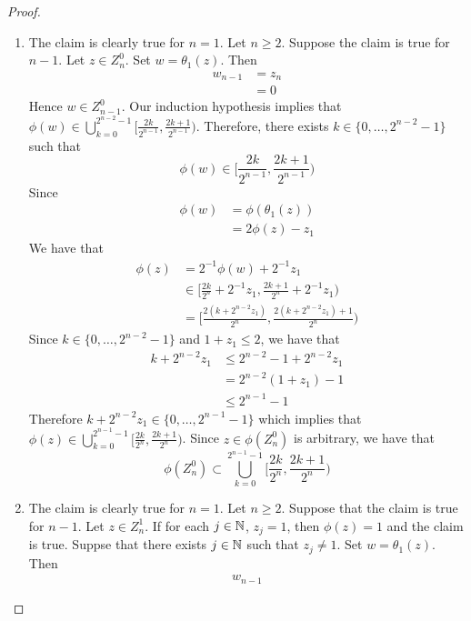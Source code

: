 \documentclass{book}
\begin{document}
	\begin{proof}\
		\begin{enumerate}
			\item The claim is clearly true for $n = 1$. Let $n \geq 2$. Suppose the claim is true for $n-1$. Let $z \in Z_n^0$. Set $w = \theta_1 (z)$. 
			Then 
			\begin{align*}
				w_{n-1} 
				& = z_n \\
				& = 0
			\end{align*}
			Hence $w \in Z_{n-1}^0$. Our induction hypothesis implies that $\phi(w) \in \bigcup\limits_{k =0}^{2^{n-2} -1} \bigg[ \frac{2k}{2^{n-1}}, \frac{2k+1}{2^{n-1}} \bigg)$.
			Therefore, there exists $k \in \{0, \ldots, 2^{n-2} -1\}$ such that $$\phi(w) \in \bigg[ \frac{2k}{2^{n-1}}, \frac{2k+1}{2^{n-1}} \bigg)$$ Since 
			\begin{align*}
				\phi(w) 
				& = \phi(\theta_1(z)) \\
				& = 2 \phi(z) - z_1
			\end{align*}
			We have that
			\begin{align*}
				\phi(z) 
				& = 2^{-1}\phi(w) + 2^{-1} z_1 \\
				& \in \bigg[ \frac{2k}{2^n} + 2^{-1}z_1, \frac{2k + 1}{2^n} +  2^{-1}z_1 \bigg) \\
				& = \bigg[ \frac{2(k+ 2^{n-2}z_1)}{2^n}, \frac{2(k+ 2^{n-2}z_1) + 1}{2^n} \bigg) 
			\end{align*}
			Since $k \in \{0, \ldots, 2^{n-2} -1\}$ and $1 + z_1 \leq 2$, we have that 
			\begin{align*}
				k+ 2^{n-2}z_1 
				& \leq 2^{n-2} -1 + 2^{n-2}z_1  \\
				&  =  2^{n-2}(1 + z_1) - 1 \\
				& \leq 2^{n-1} - 1
			\end{align*} 
			Therefore $	k+ 2^{n-2}z_1 \in \{0, \ldots, 2^{n-1} - 1\}$ which implies that $\phi(z) \in  \bigcup\limits_{k =0}^{2^{n-1} -1} \bigg[ \frac{2k}{2^n}, \frac{2k+1}{2^n} \bigg)$. Since $z \in \phi(Z_n^0)$ is arbitrary, we have that
			$$\phi(Z_n^0) \subset \bigcup\limits_{k =0}^{2^{n-1} - 1} \bigg[ \frac{2k}{2^n}, \frac{2k+1}{2^n} \bigg)$$
			\item The claim is clearly true for $n =1$. Let $n \geq 2$. Suppose that the claim is true for $n-1$. Let $z \in Z_n^1$. If for each $j \in \mathbb{N}$, $z_j = 1$, then $\phi(z) = 1$ and the claim is true. Suppse that there exists $j \in \mathbb{N}$ such that $z_j \neq 1$. Set $w = \theta_1(z)$. Then 
			\begin{align*}
				w_{n-1} 

\end{align*}
\end{enumerate}
\end{proof}
\end{document}
